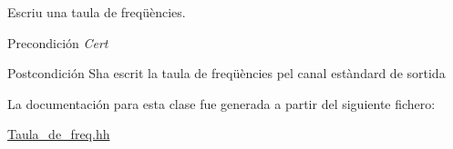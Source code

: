 Escriu una taula de freqüències. 

\begin{DoxyPrecond}{Precondición}
{\itshape Cert} 
\end{DoxyPrecond}
\begin{DoxyPostcond}{Postcondición}
S\textquotesingle{}ha escrit la taula de freqüències pel canal estàndard de sortida 
\end{DoxyPostcond}


La documentación para esta clase fue generada a partir del siguiente fichero\+:\begin{DoxyCompactItemize}
\item 
\hyperlink{_taula__de__freq_8hh}{Taula\+\_\+de\+\_\+freq.\+hh}\end{DoxyCompactItemize}

